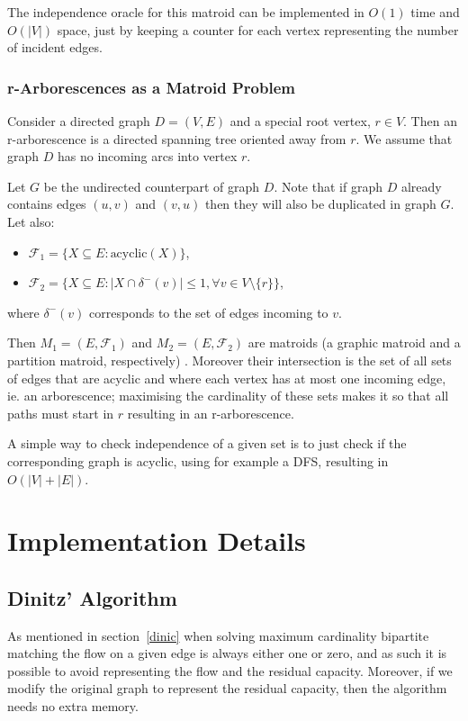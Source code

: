 \documentclass[a4,11pt]{article}
\begin{document}
The independence oracle for this matroid can be implemented in $O(1)$ time and $O(\left|V\right|)$ space, just by keeping a counter for each vertex representing the number of incident edges.

\subsubsection{r-Arborescences as a Matroid Problem}
Consider a directed graph $D = (V, E)$ and a special root vertex, $r \in V$. Then an r-arborescence is a directed spanning tree oriented away from $r$. We assume that graph $D$ has no incoming arcs into vertex $r$.

Let $G$ be the undirected counterpart of graph $D$. Note that if graph $D$ already contains edges $(u, v)$ and $(v, u)$ then they will also be duplicated in graph $G$. Let also:

\begin{itemize}
    \setlength\itemsep{-.1em}
    \item $\mathcal{F}_1 = \{X \subseteq E: \text{acyclic}(X)\}$,
    \item $\mathcal{F}_2 = \{X \subseteq E: |X \cap \delta^-(v)| \le 1, \forall v \in V \setminus \{r\} \}$,
\end{itemize}

where $\delta^-(v)$ corresponds to the set of edges incoming to $v$.

Then $M_1 = (E, \mathcal{F}_1)$ and $M_2 = (E, \mathcal{F}_2)$ are matroids (a graphic matroid and a partition matroid, respectively) \cite{goemans_handout_2011}. Moreover their intersection is the set of all sets of edges that are acyclic and where each vertex has at most one incoming edge, ie. an arborescence; maximising the cardinality of these sets makes it so that all paths must start in $r$ resulting in an r-arborescence.

A simple way to check independence of a given set is to just check if the corresponding graph is acyclic, using for example a DFS, resulting in $O(\left|V\right| + \left|E\right|)$.

\section{Implementation Details}
\subsection{Dinitz' Algorithm}
As mentioned in section~\ref{dinic} when solving maximum cardinality bipartite matching the flow on a given edge is always either one or zero, and as such it is possible to avoid representing the flow and the residual capacity. Moreover, if we modify the original graph to represent the residual capacity, then the algorithm needs no extra memory.
\end{document}
